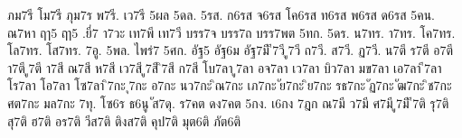{ภม7รี
โม7รี
ภุม7ร
พ7รี.
เว7รี
5ผล
5ดล.
5รส.
ก6รส
จ6รส
โค6รส
ท6รส
พ6รส
ด6รส
5คน.
ณ7หา
ฤๅ5
ฤา5
.ยี่7
า7วะ
เท7พี
เท7วี
บรร7จ
บรร7ถ
บรร7พต
5ทก.
5ดร.
น7ทร.
า7ทร.
โค7ทร.
โล7ทร.
โส7ทร.
7อู.
5พล.
ไพร่7
5ศก.
อัฐ5
อัฐ6ม
อัฐ7มี
ี7วี
ู7วี
ถ7วี.
ส7วี.
ฏ7วี.
น7ตี
ร7ตี
อ7ตี
า7ตี
ู7ตี
า7สี
ณ7สี
ห7สี
เว7สี
ู7สี
ิ7สี
ก7สี
โบ7ลา
ู7ลา
อจ7ลา
เว7ลา
บิว7ลา
มข7ลา
เอ7ลา
ี7ลา
โร7ลา
โอ7ลา
โซ7ลา
ิ7กะ
ุ7กะ
อ7กะ
นว7กะ
ิณ7กะ
เภ7กะ
ัย7กะ
ิย7กะ
รธ7กะ
ัฏ7กะ
ัฒ7กะ
ิช7กะ
ศต7กะ
มล7กะ
7ทุ.
โซ6ร
ธ6นู
ัส7ดุ.
ร7คต
ดง7คต
5กง.
เ6กง
7ฎก
ณ7มี
ว7มี
ศ7มี
ู7มี
ี7ติ
รุ7ติ
สุ7ติ
ฮ7ติ
อร7ติ
วีส7ติ
ติงส7ติ
คุป7ติ
มุต6ติ
ภัต6ติ
}
